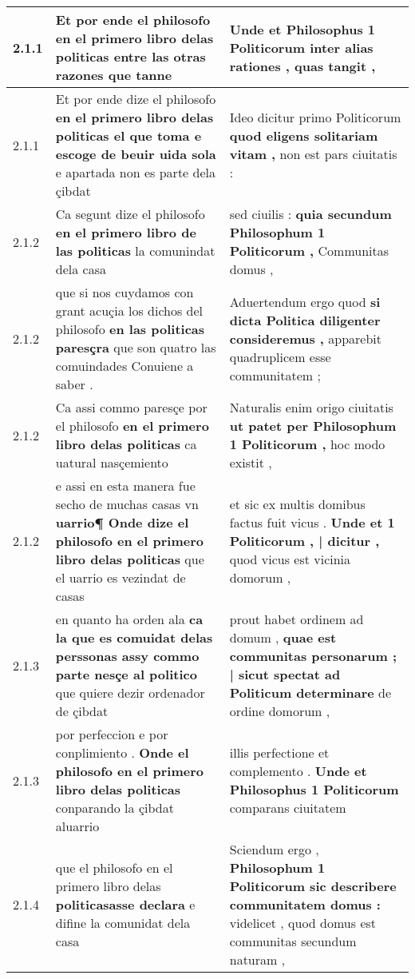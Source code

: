 \begin{tabular}{|p{1cm}|p{6.5cm}|p{6.5cm}|}
2.1.1 & Et por ende el philosofo \textbf{ en el primero libro delas politicas entre las otras razones } que tanne & Unde et Philosophus 1 Politicorum \textbf{ inter alias rationes , } quas tangit , \\\hline
2.1.1 & Et por ende dize el philosofo \textbf{ en el primero libro delas politicas el que toma e escoge de beuir uida sola } e apartada non es parte dela çibdat & Ideo dicitur primo Politicorum \textbf{ quod eligens solitariam vitam , } non est pars ciuitatis : \\\hline
2.1.2 & Ca segunt dize el philosofo \textbf{ en el primero libro de las politicas } la comunindat dela casa & sed ciuilis : \textbf{ quia secundum Philosophum 1 Politicorum , } Communitas domus , \\\hline
2.1.2 & que si nos cuydamos con grant acuçia los dichos del philosofo \textbf{ en las politicas paresçra } que son quatro las comuindades Conuiene a saber . & Aduertendum ergo quod \textbf{ si dicta Politica diligenter consideremus , } apparebit quadruplicem esse communitatem ; \\\hline
2.1.2 & Ca assi commo paresçe por el philosofo \textbf{ en el primero libro delas politicas } ca uatural nasçemiento & Naturalis enim origo ciuitatis \textbf{ ut patet per Philosophum 1 Politicorum , } hoc modo existit , \\\hline
2.1.2 & e assi en esta manera fue secho de muchas casas vn \textbf{ uarrio¶ Onde dize el philosofo en el primero libro delas politicas } que el uarrio es vezindat de casas & et sic ex multis domibus factus fuit vicus . \textbf{ Unde et 1 Politicorum , | dicitur , } quod vicus est vicinia domorum , \\\hline
2.1.3 & en quanto ha orden ala \textbf{ ca la que es comuidat delas perssonas assy commo parte nesçe al politico } que quiere dezir ordenador de çibdat & prout habet ordinem ad domum , \textbf{ quae est communitas personarum ; | sicut spectat ad Politicum determinare } de ordine domorum , \\\hline
2.1.3 & por perfeccion e por conplimiento . \textbf{ Onde el philosofo en el primero libro delas politicas } conparando la çibdat aluarrio & illis perfectione et complemento . \textbf{ Unde et Philosophus 1 Politicorum } comparans ciuitatem \\\hline
2.1.4 & que el philosofo en el primero libro delas \textbf{ politicasasse declara } e difine la comunidat dela casa & Sciendum ergo , \textbf{ Philosophum 1 Politicorum sic describere communitatem domus : } videlicet , quod domus est communitas secundum naturam , \\\hline

\end{tabular}
